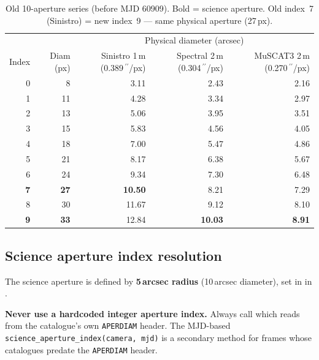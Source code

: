 \documentclass[12pt,a4paper]{article}
\begin{document}
\begin{table}[h!]
\centering
\small
\begin{tabular}{rr rrr}
\toprule
 & & \multicolumn{3}{c}{Physical diameter (arcsec)} \\
\cmidrule(lr){3-5}
Index & Diam (px) &
  \makecell{Sinistro 1\,m\\(0.389\,\ensuremath{^{\prime\prime}}/px)} &
  \makecell{Spectral 2\,m\\(0.304\,\ensuremath{^{\prime\prime}}/px)} &
  \makecell{MuSCAT3 2\,m\\(0.270\,\ensuremath{^{\prime\prime}}/px)} \\
\midrule
  0 &  8 &  3.11 &  2.43 &  2.16 \\
  1 & 11 &  4.28 &  3.34 &  2.97 \\
  2 & 13 &  5.06 &  3.95 &  3.51 \\
  3 & 15 &  5.83 &  4.56 &  4.05 \\
  4 & 18 &  7.00 &  5.47 &  4.86 \\
  5 & 21 &  8.17 &  6.38 &  5.67 \\
  6 & 24 &  9.34 &  7.30 &  6.48 \\
  \textbf{7} & \textbf{27} & \textbf{10.50} &  8.21 &  7.29 \\
  8 & 30 & 11.67 &  9.12 &  8.10 \\
  \textbf{9} & \textbf{33} & 12.84 & \textbf{10.03} & \textbf{8.91} \\
\bottomrule
\end{tabular}
\caption{Old 10-aperture series (before MJD 60909).  Bold = science aperture.
  Old index~7 (Sinistro) = new index~9 --- same physical aperture (27\,px).}
\label{tab:aper-old}
\end{table}

\subsection{Science aperture index resolution}

The science aperture is defined by \textbf{5\,arcsec radius} (10\,arcsec
diameter), set in  in
.

\begin{warnbox}
\textbf{Never use a hardcoded integer aperture index.}  Always call
 which reads from the catalogue's own
\texttt{APERDIAM} header.  The MJD-based \texttt{science\_aperture\_index(camera,
mjd)} is a secondary method for frames whose catalogues predate the
\texttt{APERDIAM} header.
\end{warnbox}
\end{document}
